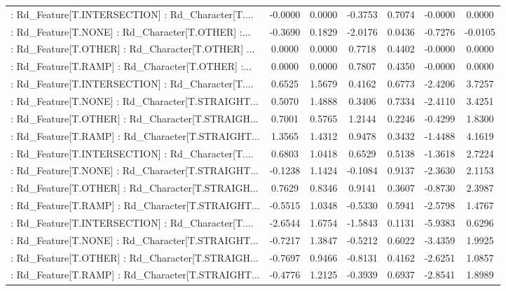 \begin{longtable}{p{4cm}cccccc}
 : Rd\_Feature[T.INTERSECTION] : Rd\_Character[T.... & -0.0000 &    0.0000 & -0.3753 &       0.7074 & -0.0000 &  0.0000 \\
 : Rd\_Feature[T.NONE] : Rd\_Character[T.OTHER] :... & -0.3690 &    0.1829 & -2.0176 &       0.0436 & -0.7276 & -0.0105 \\
 : Rd\_Feature[T.OTHER] : Rd\_Character[T.OTHER] ... &  0.0000 &    0.0000 &  0.7718 &       0.4402 & -0.0000 &  0.0000 \\
 : Rd\_Feature[T.RAMP] : Rd\_Character[T.OTHER] :... &  0.0000 &    0.0000 &  0.7807 &       0.4350 & -0.0000 &  0.0000 \\
 : Rd\_Feature[T.INTERSECTION] : Rd\_Character[T.... &  0.6525 &    1.5679 &  0.4162 &       0.6773 & -2.4206 &  3.7257 \\
 : Rd\_Feature[T.NONE] : Rd\_Character[T.STRAIGHT... &  0.5070 &    1.4888 &  0.3406 &       0.7334 & -2.4110 &  3.4251 \\
 : Rd\_Feature[T.OTHER] : Rd\_Character[T.STRAIGH... &  0.7001 &    0.5765 &  1.2144 &       0.2246 & -0.4299 &  1.8300 \\
 : Rd\_Feature[T.RAMP] : Rd\_Character[T.STRAIGHT... &  1.3565 &    1.4312 &  0.9478 &       0.3432 & -1.4488 &  4.1619 \\
 : Rd\_Feature[T.INTERSECTION] : Rd\_Character[T.... &  0.6803 &    1.0418 &  0.6529 &       0.5138 & -1.3618 &  2.7224 \\
 : Rd\_Feature[T.NONE] : Rd\_Character[T.STRAIGHT... & -0.1238 &    1.1424 & -0.1084 &       0.9137 & -2.3630 &  2.1153 \\
 : Rd\_Feature[T.OTHER] : Rd\_Character[T.STRAIGH... &  0.7629 &    0.8346 &  0.9141 &       0.3607 & -0.8730 &  2.3987 \\
 : Rd\_Feature[T.RAMP] : Rd\_Character[T.STRAIGHT... & -0.5515 &    1.0348 & -0.5330 &       0.5941 & -2.5798 &  1.4767 \\
 : Rd\_Feature[T.INTERSECTION] : Rd\_Character[T.... & -2.6544 &    1.6754 & -1.5843 &       0.1131 & -5.9383 &  0.6296 \\
 : Rd\_Feature[T.NONE] : Rd\_Character[T.STRAIGHT... & -0.7217 &    1.3847 & -0.5212 &       0.6022 & -3.4359 &  1.9925 \\
 : Rd\_Feature[T.OTHER] : Rd\_Character[T.STRAIGH... & -0.7697 &    0.9466 & -0.8131 &       0.4162 & -2.6251 &  1.0857 \\
 : Rd\_Feature[T.RAMP] : Rd\_Character[T.STRAIGHT... & -0.4776 &    1.2125 & -0.3939 &       0.6937 & -2.8541 &  1.8989 \\

\end{longtable}
